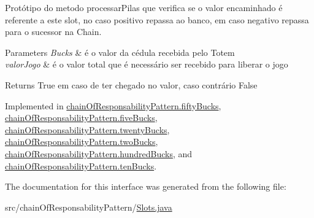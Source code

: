 Protótipo do metodo processar\+Pilas que verifica se o valor encaminhado é referente a este slot, no caso positivo repassa ao banco, em caso negativo repassa para o sucessor na Chain. 


\begin{DoxyParams}{Parameters}
{\em Bucks} & é o valor da cédula recebida pelo Totem \\
\hline
{\em valor\+Jogo} & é o valor total que é necessário ser recebido para liberar o jogo \\
\hline
\end{DoxyParams}
\begin{DoxyReturn}{Returns}
True em caso de ter chegado no valor, caso contrário False 
\end{DoxyReturn}


Implemented in \mbox{\hyperlink{classchain_of_responsability_pattern_1_1fifty_bucks_a4c121b5ed57a0de7ea0e1669d4b60b5c}{chain\+Of\+Responsability\+Pattern.\+fifty\+Bucks}}, \mbox{\hyperlink{classchain_of_responsability_pattern_1_1five_bucks_a2965b1e5ea534dbe4148a5b69d13f1a6}{chain\+Of\+Responsability\+Pattern.\+five\+Bucks}}, \mbox{\hyperlink{classchain_of_responsability_pattern_1_1twenty_bucks_aa8536487b98149e0c022258bb255a3b1}{chain\+Of\+Responsability\+Pattern.\+twenty\+Bucks}}, \mbox{\hyperlink{classchain_of_responsability_pattern_1_1two_bucks_ac2c6c72c1e3d129c2e414f744196f547}{chain\+Of\+Responsability\+Pattern.\+two\+Bucks}}, \mbox{\hyperlink{classchain_of_responsability_pattern_1_1hundred_bucks_adef35c81f1111468fc8a3de01512b85e}{chain\+Of\+Responsability\+Pattern.\+hundred\+Bucks}}, and \mbox{\hyperlink{classchain_of_responsability_pattern_1_1ten_bucks_a3ab345bb0d74e82a74f185aabf382da6}{chain\+Of\+Responsability\+Pattern.\+ten\+Bucks}}.



The documentation for this interface was generated from the following file\+:\begin{DoxyCompactItemize}
\item 
src/chain\+Of\+Responsability\+Pattern/\mbox{\hyperlink{_slots_8java}{Slots.\+java}}\end{DoxyCompactItemize}
